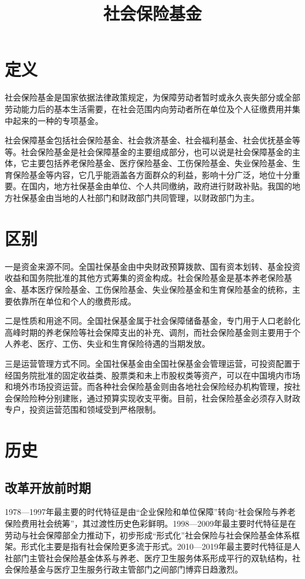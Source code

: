\documentclass{ctexart}
\title{社会保险基金}
\begin{document}
\section{定义}
社会保险基金是国家依据法律政策规定，为保障劳动者暂时或永久丧失部分或全部劳动能力后的基本生活需要，在社会范围内向劳动者所在单位及个人征缴费用并集中起来的一种的专项基金。

社会保障基金包括社会保险基金、社会救济基金、社会福利基金、社会优抚基金等等。社会保险基金是社会保障基金的主要组成部分，也可以说是社会保障基金的主体，它主要包括养老保险基金、医疗保险基金、工伤保险基金、失业保险基金、生育保险基金等内容，它几乎能涵盖各方面群众的利益，影响十分广泛，地位十分重要。在国内，地方社保基金由单位、个人共同缴纳，政府进行财政补贴。我国的地方社保基金由当地的人社部门和财政部门共同管理，以财政部门为主。
\section{区别}
一是资金来源不同。全国社保基金由中央财政预算拨款、国有资本划转、基金投资收益和国务院批准的其他方式筹集的资金构成。社会保险基金是基本养老保险基金、基本医疗保险基金、工伤保险基金、失业保险基金和生育保险基金的统称，主要依靠所在单位和个人的缴费形成。

二是性质和用途不同。全国社保基金属于社会保障储备基金，专门用于人口老龄化高峰时期的养老保险等社会保障支出的补充、调剂，而社会保险基金则主要用于个人养老、医疗、工伤、失业和生育保险待遇的当期发放。

三是运营管理方式不同。全国社保基金由全国社保基金会管理运营，可投资配置于经国务院批准的固定收益类、股票类和未上市股权类等资产，可以在中国境内市场和境外市场投资运营。而各种社会保险基金则由各地社会保险经办机构管理，按社会保险险种分别建账，通过预算实现收支平衡。目前，社会保险基金必须存入财政专户，投资运营范围和领域受到严格限制。
\section{历史}
\subsection{改革开放前时期}

1978—1997年最主要的时代特征是由“企业保险和单位保障”转向“社会保险与养老保险费用社会统筹”，其过渡性历史色彩鲜明。1998—2009年最主要时代特征是在劳动与社会保障部全力推动下，初步形成“形式化”社会保险与社会保险基金体系框架。形式化主要是指有社会保险更多流于形式。2010—2019年最主要时代特征是人社部门主管社会保险基金体系与养老、医疗卫生服务体系形成平行的双轨结构，社会保险基金与医疗卫生服务行政主管部门之间部门博弈日趋激烈。
\end{document}
